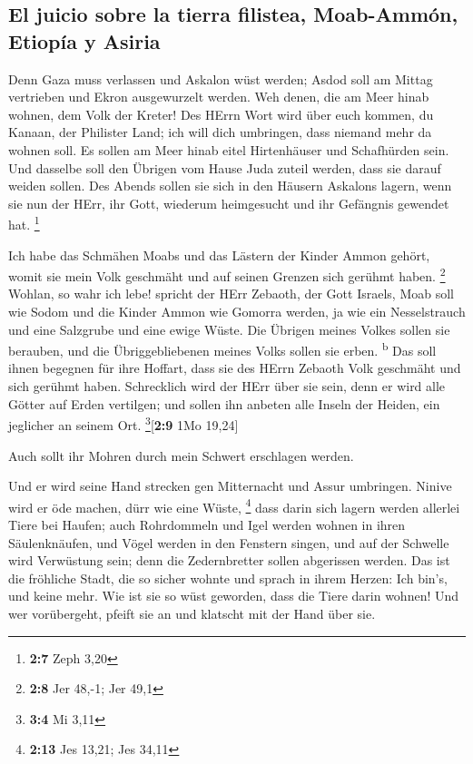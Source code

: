 \hypertarget{el-juicio-sobre-la-tierra-filistea-moab-ammuxf3n-etiopuxeda-y-asiria}{%
\subsection{El juicio sobre la tierra filistea, Moab-Ammón, Etiopía y
Asiria}\label{el-juicio-sobre-la-tierra-filistea-moab-ammuxf3n-etiopuxeda-y-asiria}}

 Denn Gaza muss verlassen und Askalon wüst werden; Asdod
soll am Mittag vertrieben und Ekron ausgewurzelt werden. 
Weh denen, die am Meer hinab wohnen, dem Volk der Kreter! Des HErrn Wort
wird über euch kommen, du Kanaan, der Philister Land; ich will dich
umbringen, dass niemand mehr da wohnen soll.  Es sollen am
Meer hinab eitel Hirtenhäuser und Schafhürden sein.  Und
dasselbe soll den Übrigen vom Hause Juda zuteil werden, dass sie darauf
weiden sollen. Des Abends sollen sie sich in den Häusern Askalons
lagern, wenn sie nun der HErr, ihr Gott, wiederum heimgesucht und ihr
Gefängnis gewendet hat. \footnote{\textbf{2:7} Zeph 3,20}

 Ich habe das Schmähen Moabs und das Lästern der Kinder
Ammon gehört, womit sie mein Volk geschmäht und auf seinen Grenzen sich
gerühmt haben. \footnote{\textbf{2:8} Jer 48,-1; Jer 49,1}
 Wohlan, so wahr ich lebe! spricht der HErr Zebaoth, der
Gott Israels, Moab soll wie Sodom und die Kinder Ammon wie Gomorra
werden, ja wie ein Nesselstrauch und eine Salzgrube und eine ewige
Wüste. Die Übrigen meines Volkes sollen sie berauben, und die
Übriggebliebenen meines Volks sollen sie erben. \textsuperscript{b}
 Das soll ihnen begegnen für ihre Hoffart, dass sie des
HErrn Zebaoth Volk geschmäht und sich gerühmt haben. 
Schrecklich wird der HErr über sie sein, denn er wird alle Götter auf
Erden vertilgen; und sollen ihn anbeten alle Inseln der Heiden, ein
jeglicher an seinem Ort. \footnote{\textbf{3:4} Mi 3,11}{[}\textbf{2:9}
1Mo 19,24{]}

 Auch sollt ihr Mohren durch mein Schwert erschlagen
werden.

 Und er wird seine Hand strecken gen Mitternacht und
Assur umbringen. Ninive wird er öde machen, dürr wie eine Wüste,
\footnote{\textbf{2:13} Jes 13,21; Jes 34,11}  dass darin
sich lagern werden allerlei Tiere bei Haufen; auch Rohrdommeln und Igel
werden wohnen in ihren Säulenknäufen, und Vögel werden in den Fenstern
singen, und auf der Schwelle wird Verwüstung sein; denn die
Zedernbretter sollen abgerissen werden.  Das ist die
fröhliche Stadt, die so sicher wohnte und sprach in ihrem Herzen: Ich
bin's, und keine mehr. Wie ist sie so wüst geworden, dass die Tiere
darin wohnen! Und wer vorübergeht, pfeift sie an und klatscht mit der
Hand über sie.

